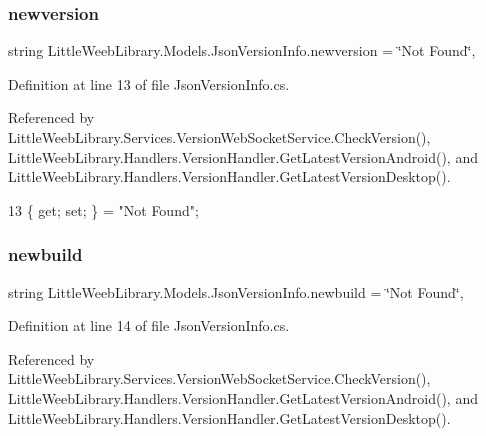 \subsubsection{\texorpdfstring{newversion}{newversion}}
{\footnotesize\ttfamily string Little\+Weeb\+Library.\+Models.\+Json\+Version\+Info.\+newversion = \char`\"{}Not Found\char`\"{}\hspace{0.3cm}{\ttfamily [get]}, {\ttfamily [set]}}



Definition at line 13 of file Json\+Version\+Info.\+cs.



Referenced by Little\+Weeb\+Library.\+Services.\+Version\+Web\+Socket\+Service.\+Check\+Version(), Little\+Weeb\+Library.\+Handlers.\+Version\+Handler.\+Get\+Latest\+Version\+Android(), and Little\+Weeb\+Library.\+Handlers.\+Version\+Handler.\+Get\+Latest\+Version\+Desktop().


\begin{DoxyCode}
13 \{ \textcolor{keyword}{get}; \textcolor{keyword}{set}; \} = \textcolor{stringliteral}{"Not Found"};
\end{DoxyCode}
\mbox{\label{class_little_weeb_library_1_1_models_1_1_json_version_info_abb2527c1c41e946dd71fe862a48a5f0f}} 
\subsubsection{\texorpdfstring{newbuild}{newbuild}}
{\footnotesize\ttfamily string Little\+Weeb\+Library.\+Models.\+Json\+Version\+Info.\+newbuild = \char`\"{}Not Found\char`\"{}\hspace{0.3cm}{\ttfamily [get]}, {\ttfamily [set]}}



Definition at line 14 of file Json\+Version\+Info.\+cs.



Referenced by Little\+Weeb\+Library.\+Services.\+Version\+Web\+Socket\+Service.\+Check\+Version(), Little\+Weeb\+Library.\+Handlers.\+Version\+Handler.\+Get\+Latest\+Version\+Android(), and Little\+Weeb\+Library.\+Handlers.\+Version\+Handler.\+Get\+Latest\+Version\+Desktop().


